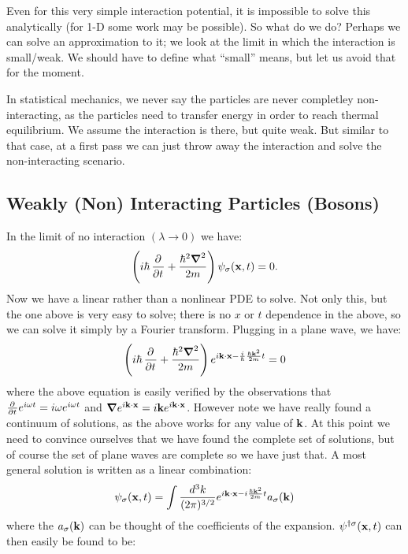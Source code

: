 Even for this very simple interaction potential, it is impossible to solve this analytically (for 1-D some work may be possible). So what do we do? Perhaps we can solve an approximation to it; we look at the limit in which the interaction is small/weak. We should have to define what ``small'' means, but let us avoid that for the moment.

In statistical mechanics, we never say the particles are never completley non-interacting, as the particles need to transfer energy in order to reach thermal equilibrium. We assume the interaction is there, but quite weak. But similar to that case, at a first pass we can just throw away the interaction and solve the non-interacting scenario.

\subsection{Weakly (Non) Interacting Particles (Bosons)}
In the limit of no interaction $(\lambda \to 0)$ we have:
\begin{equation}
    \left(i\hbar\dpd{}{t} + \frac{\hbar^2\nabla^2}{2m}\right)\psi_\sigma(\v{x}, t) = 0.
\end{equation}
Now we have a linear rather than a nonlinear PDE to solve. Not only this, but the one above is very easy to solve; there is no $x$ or $t$ dependence in the above, so we can solve it simply by a Fourier transform. Plugging in a plane wave, we have:
\begin{equation}
    \left(i\hbar\dpd{}{t} + \frac{\hbar^2\nabla^2}{2m}\right)e^{i\v{k}\cdot\v{x} - \frac{i}{\hbar}\frac{\hbar\v{k}^2}{2m}t} = 0
\end{equation}
where the above equation is easily verified by the observations that $\pd{}{t}e^{i\omega t} = i\omega e^{i\omega t}$ and $\nabla e^{i\v{k} \cdot \v{x}} = i\v{k}e^{i\v{k} \cdot \v{x}}$. However note we have really found a continuum of solutions, as the above works for any value of $\mathbf{k}$. At this point we need to convince ourselves that we have found the complete set of solutions, but of course the set of plane waves are complete so we have just that. A most general solution is written as a linear combination:
\begin{equation}
    \psi_\sigma(\mathbf{x}, t) = \int \frac{d^3k}{(2\pi)^{3/2}}e^{i\mathbf{k}\cdot \mathbf{x} - i\frac{\hbar\mathbf{k}^2}{2m}t}a_\sigma(\mathbf{k})
\end{equation}
where the $a_\sigma(\mathbf{k})$ can be thought of the coefficients of the expansion. $\psi^{\dagger\sigma}(\mathbf{x}, t)$ can then easily be found to be:
